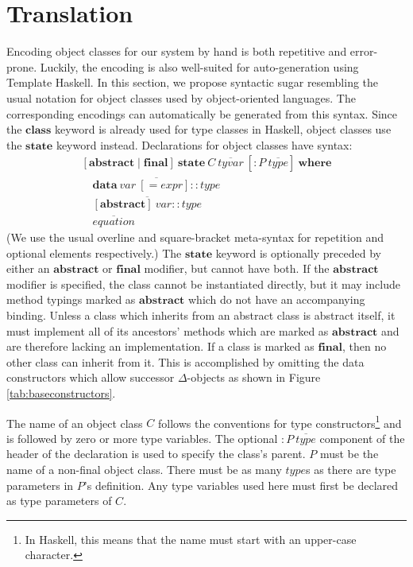 \section{Translation}
\label{sec:auto}

Encoding object classes for our system by hand is both repetitive and error-prone. Luckily, the encoding is also well-suited for auto-generation using Template Haskell.
In this section, we propose syntactic sugar resembling the usual notation for object classes used by object-oriented languages. The corresponding encodings can automatically be generated from this syntax. Since the $\mathbf{class}$ keyword is already used for type classes in Haskell, object classes use the $\mathbf{state}$ keyword instead.
Declarations for object classes have syntax:
\begin{displaymath}
\begin{array}{l}
[\mathbf{abstract} \mid \mathbf{final}]~\mathbf{state}~\mathit{C}~\overline{\mathit{tyvar}}~[: P~\overline{\mathit{type}}]~\mathbf{where} \\
\quad \overline{\mathbf{data}~\mathit{var}~[= \mathit{expr}] :: \mathit{type}} \\
\quad \overline{[\mathbf{abstract}]~\mathit{var} :: \mathit{type}} \\
\quad \overline{\mathit{equation}}
\end{array}
\end{displaymath}
(We use the usual overline and square-bracket meta-syntax for repetition
and optional elements respectively.)
The $\mathbf{state}$ keyword is optionally preceded by either an $\mathbf{abstract}$ or $\mathbf{final}$ modifier, but cannot have both. If the $\mathbf{abstract}$ modifier is specified, the class cannot be instantiated directly, but it may include method typings marked as $\mathbf{abstract}$ which do not have an accompanying binding. Unless a class which inherits from an abstract class is abstract itself, it must implement all of its ancestors' methods which are marked as $\mathbf{abstract}$ and are therefore lacking an implementation. If a class is marked as $\mathbf{final}$, then no other class can inherit from it. This is accomplished by omitting the data constructors which allow successor $\Delta$-objects as shown in Figure \ref{tab:baseconstructors}.

The name of an object class $C$ follows the conventions for type constructors\footnote{In Haskell, this means that the name must start with an upper-case character.} and is followed by zero or more type variables. The optional $: \mathit{P}~\overline{\mathit{type}}$ component of the header of the declaration is used to specify the class's parent. $P$ must be the name of a non-final object class. There must be as many $\mathit{type}$s as there are type parameters in $P$'s definition. Any type variables used here must first be declared as type parameters of $C$.

